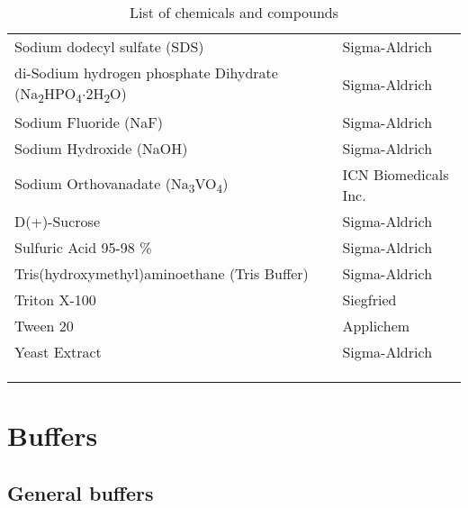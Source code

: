 \begin{center}
\begin{longtable}{l l}
Sodium dodecyl sulfate (SDS) & Sigma-Aldrich\\
di-Sodium hydrogen phosphate Dihydrate (Na\textsubscript{2}HPO\textsubscript{4}$\cdot$2H\textsubscript{2}O) & Sigma-Aldrich\\
Sodium Fluoride (NaF) & Sigma-Aldrich\\
Sodium Hydroxide (NaOH) & Sigma-Aldrich \\
Sodium Orthovanadate (Na\textsubscript{3}VO\textsubscript{4}) & ICN Biomedicals Inc.\\ 
D(+)-Sucrose & Sigma-Aldrich \\
Sulfuric Acid 95-98 \% & Sigma-Aldrich\\
Tris(hydroxymethyl)aminoethane (Tris Buffer) & Sigma-Aldrich \\
Triton X-100 & Siegfried \\
Tween 20 & Applichem \\
Yeast Extract & Sigma-Aldrich \\
\\

\caption[Chemicals and compounds]{List of chemicals and compounds}\\

\label{Chemicals}
\end{longtable}

\end{center}



\section{Buffers}

\subsection{General buffers}

